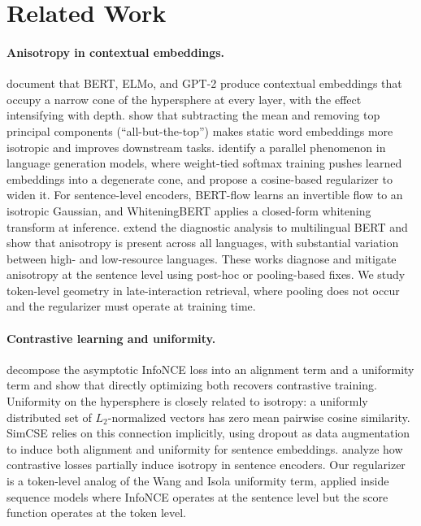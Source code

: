 \section{Related Work}
\label{sec:related}

\paragraph{Anisotropy in contextual embeddings.} \citet{ethayarajh2019contextual} document that BERT, ELMo, and GPT-2 produce contextual embeddings that occupy a narrow cone of the hypersphere at every layer, with the effect intensifying with depth. \citet{mu2018allbutthetop} show that subtracting the mean and removing top principal components (``all-but-the-top'') makes static word embeddings more isotropic and improves downstream tasks. \citet{gao2019representation} identify a parallel phenomenon in language generation models, where weight-tied softmax training pushes learned embeddings into a degenerate cone, and propose a cosine-based regularizer to widen it. For sentence-level encoders, BERT-flow \citep{li2020sentenceembeddings} learns an invertible flow to an isotropic Gaussian, and WhiteningBERT \citep{huang2021whiteningbert} applies a closed-form whitening transform at inference. \citet{rajaee2022isotropy} extend the diagnostic analysis to multilingual BERT and show that anisotropy is present across all languages, with substantial variation between high- and low-resource languages. These works diagnose and mitigate anisotropy at the sentence level using post-hoc or pooling-based fixes. We study token-level geometry in late-interaction retrieval, where pooling does not occur and the regularizer must operate at training time.

\paragraph{Contrastive learning and uniformity.} \citet{wang2020understanding} decompose the asymptotic InfoNCE loss into an alignment term and a uniformity term and show that directly optimizing both recovers contrastive training. Uniformity on the hypersphere is closely related to isotropy: a uniformly distributed set of $L_2$-normalized vectors has zero mean pairwise cosine similarity. SimCSE \citep{gao2021simcse} relies on this connection implicitly, using dropout as data augmentation to induce both alignment and uniformity for sentence embeddings. \citet{xiao2023isotropy} analyze how contrastive losses partially induce isotropy in sentence encoders. Our regularizer is a token-level analog of the Wang and Isola uniformity term, applied inside sequence models where InfoNCE operates at the sentence level but the score function operates at the token level.


